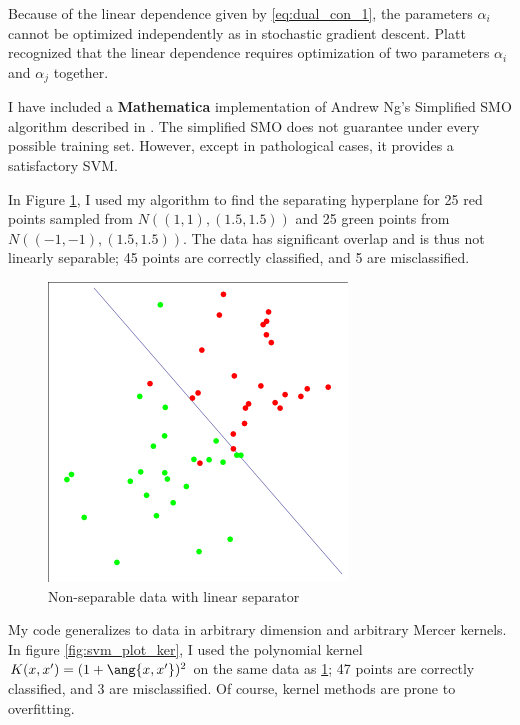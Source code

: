 \documentclass[10pt]{article}
\begin{document}
Because of the linear dependence given by \eqref{eq:dual_con_1}, the parameters $\alpha_{i}$ cannot be optimized independently as in stochastic gradient descent. Platt recognized that the linear dependence requires optimization of two parameters $\alpha_{i}$ and $\alpha_{j}$ together. 

I have included a \textbf{Mathematica} implementation of Andrew Ng's Simplified SMO algorithm described in \cite{ng_smo}. The simplified SMO does not guarantee under every possible training set. However, except in pathological cases, it provides a satisfactory SVM. 

In Figure \ref{fig:svm_plot_2d}, I used my algorithm to find the separating hyperplane for 25 red points sampled from $N((1,1),(1.5,1.5))$ and 25 green points from $N((-1,-1),(1.5,1.5))$. The data has significant overlap and is thus not linearly separable; 45 points are correctly classified, and 5 are misclassified. 

\begin{figure}[htb]
				\begin{center}
				\includegraphics[width=300px]{Project/svm_plot_2d.pdf}
				\caption{Non-separable data with linear separator}
					\label{fig:svm_plot_2d}
				\end{center}
				\end{figure}

My code generalizes to data in arbitrary dimension and arbitrary Mercer kernels. In figure \ref{fig:svm_plot_ker}, I used the polynomial kernel $K(x,x')=(1+\ang{x,x'})^{2}$ on the same data as \ref{fig:svm_plot_2d}; 47 points are correctly classified, and 3 are misclassified. Of course, kernel methods are prone to overfitting. 
\end{document}
